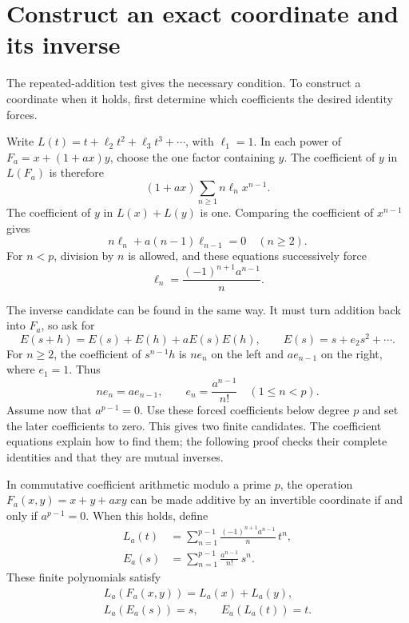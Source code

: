 \section{Construct an exact coordinate and its inverse}\label{sec:exact-theorem}

The repeated-addition test gives the necessary condition. To construct a coordinate when it holds, first determine which coefficients the desired identity forces.

Write \(L(t)=t+\ell_2t^2+\ell_3t^3+\cdots\), with \(\ell_1=1\). In each power of \(F_a=x+(1+ax)y\), choose the one factor containing \(y\). The coefficient of \(y\) in \(L(F_a)\) is therefore
\[
 (1+ax)\sum_{n\ge1}n\ell_nx^{n-1}.
\]
The coefficient of \(y\) in \(L(x)+L(y)\) is one. Comparing the coefficient of \(x^{n-1}\) gives
\begin{equation}\label{eq:coefficient-recursion}
 n\ell_n+a(n-1)\ell_{n-1}=0\quad(n\ge2).
\end{equation}
For \(n<p\), division by \(n\) is allowed, and these equations successively force
\[
 \ell_n=\frac{(-1)^{n+1}a^{n-1}}n.
\]

The inverse candidate can be found in the same way. It must turn addition back into \(F_a\), so ask for
\[
 E(s+h)=E(s)+E(h)+aE(s)E(h),\qquad
 E(s)=s+e_2s^2+\cdots.
\]
For \(n\ge2\), the coefficient of \(s^{n-1}h\) is \(ne_n\) on the left and \(ae_{n-1}\) on the right, where \(e_1=1\). Thus
\[
 ne_n=ae_{n-1},\qquad e_n=\frac{a^{n-1}}{n!}\quad(1\le n<p).
\]
Assume now that \(a^{p-1}=0\). Use these forced coefficients below degree \(p\) and set the later coefficients to zero. This gives two finite candidates. The coefficient equations explain how to find them; the following proof checks their complete identities and that they are mutual inverses.

\begin{theorem}\label{thm:family}
In commutative coefficient arithmetic modulo a prime \(p\), the operation \(F_a(x,y)=x+y+a xy\) can be made additive by an invertible coordinate if and only if \(a^{p-1}=0\). When this holds, define
\begin{align}
 L_a(t)&=\sum_{n=1}^{p-1}\frac{(-1)^{n+1}a^{n-1}}n\,t^n,
 \label{eq:finite-log}\\
 E_a(s)&=\sum_{n=1}^{p-1}\frac{a^{n-1}}{n!}\,s^n.
 \label{eq:finite-exp}
\end{align}
These finite polynomials satisfy
\begin{gather}
 L_a(F_a(x,y))=L_a(x)+L_a(y),\label{eq:theorem-add}\\
 L_a(E_a(s))=s,\qquad E_a(L_a(t))=t.\label{eq:theorem-inverse}
\end{gather}
\end{theorem}

